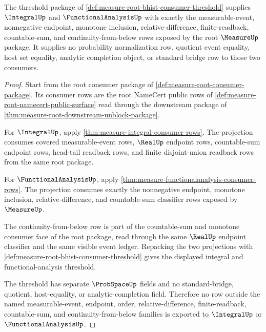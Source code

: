 \begin{theorem}
\label{thm:measure-root-bhist-integral-functional-threshold}
The threshold package of
\autoref{def:measure-root-bhist-consumer-threshold} supplies $\IntegralUp$ and
$\FunctionalAnalysisUp$ with exactly the measurable-event, nonnegative
endpoint, monotone inclusion, relative-difference, finite-readback,
countable-sum, and continuity-from-below rows exposed by the root
$\MeasureUp$ package. It supplies no probability normalization row, quotient
event equality, host set equality, analytic completion object, or standard
bridge row to those two consumers.
\end{theorem}
\begin{proof}
Start from the root consumer package of
\autoref{def:measure-root-consumer-package}. Its consumer rows are the root
NameCert public rows of
\autoref{def:measure-root-namecert-public-surface} read through the downstream
package of \autoref{thm:measure-root-downstream-unblock-package}.

For $\IntegralUp$, apply \autoref{thm:measure-integral-consumer-rows}. The
projection consumes covered measurable-event rows, $\RealUp$ endpoint rows,
countable-sum endpoint rows, head-tail readback rows, and finite
disjoint-union readback rows from the same root package.

For $\FunctionalAnalysisUp$, apply
\autoref{thm:measure-functionalanalysis-consumer-rows}. The projection
consumes exactly the nonnegative endpoint, monotone inclusion,
relative-difference, and countable-sum classifier rows exposed by
$\MeasureUp$.

The continuity-from-below row is part of the countable-sum and monotone
consumer face of the root package, read through the same $\RealUp$ endpoint
classifier and the same visible event ledger. Repacking the two projections
with \autoref{def:measure-root-bhist-consumer-threshold} gives the displayed
integral and functional-analysis threshold.

The threshold has separate $\ProbSpaceUp$ fields and no standard-bridge,
quotient, host-equality, or analytic-completion field. Therefore no row
outside the named measurable-event, endpoint, order, relative-difference,
finite-readback, countable-sum, and continuity-from-below families is exported
to $\IntegralUp$ or $\FunctionalAnalysisUp$.
\end{proof}

